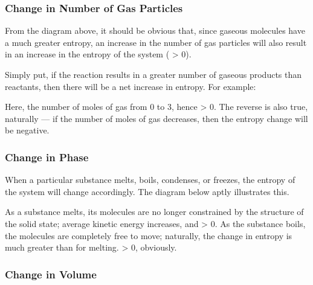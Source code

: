 
			\subsubsection{Change in Number of Gas Particles}

				From the diagram above, it should be obvious that, since gaseous molecules have a much greater entropy, an increase in the number
				of gas particles will also result in an increase in the entropy of the system (\entr{} > 0).

				Simply put, if the reaction results in a greater number of gaseous products than reactants, then there will be a net
				increase in entropy. For example:


				Here, the number of moles of gas  from 0 to 3, hence \entr{} > 0. The reverse is also true, naturally --- if the
				number of moles of gas decreases, then the entropy change will be negative.


			\pagebreak
			\subsubsection{Change in Phase}

				When a particular substance melts, boils, condenses, or freezes, the entropy of the system will change accordingly.
				The diagram below aptly illustrates this.


				As a substance melts, its molecules are no longer constrained by the structure of the solid state; average kinetic energy increases,
				and \entr{} > 0. As the substance boils, the molecules are completely free to move; naturally, the change in entropy is much greater
				than for melting. \entr{} > 0, obviously.


			\subsubsection{Change in Volume}

